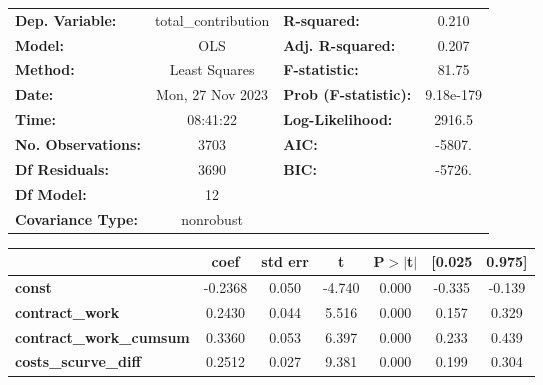 \begin{center}
\begin{tabular}{lclc}
\toprule
\textbf{Dep. Variable:}                   & total\_contribution & \textbf{  R-squared:         } &     0.210   \\
\textbf{Model:}                           &         OLS         & \textbf{  Adj. R-squared:    } &     0.207   \\
\textbf{Method:}                          &    Least Squares    & \textbf{  F-statistic:       } &     81.75   \\
\textbf{Date:}                            &   Mon, 27 Nov 2023  & \textbf{  Prob (F-statistic):} & 9.18e-179   \\
\textbf{Time:}                            &       08:41:22      & \textbf{  Log-Likelihood:    } &    2916.5   \\
\textbf{No. Observations:}                &          3703       & \textbf{  AIC:               } &    -5807.   \\
\textbf{Df Residuals:}                    &          3690       & \textbf{  BIC:               } &    -5726.   \\
\textbf{Df Model:}                        &            12       & \textbf{                     } &             \\
\textbf{Covariance Type:}                 &      nonrobust      & \textbf{                     } &             \\
\bottomrule
\end{tabular}
\begin{tabular}{lcccccc}
                                          & \textbf{coef} & \textbf{std err} & \textbf{t} & \textbf{P$> |$t$|$} & \textbf{[0.025} & \textbf{0.975]}  \\
\midrule
\textbf{const}                            &      -0.2368  &        0.050     &    -4.740  &         0.000        &       -0.335    &       -0.139     \\
\textbf{contract\_work}                   &       0.2430  &        0.044     &     5.516  &         0.000        &        0.157    &        0.329     \\
\textbf{contract\_work\_cumsum}           &       0.3360  &        0.053     &     6.397  &         0.000        &        0.233    &        0.439     \\
\textbf{costs\_scurve\_diff}              &       0.2512  &        0.027     &     9.381  &         0.000        &        0.199    &        0.304     \\

\end{tabular}
\end{center}
